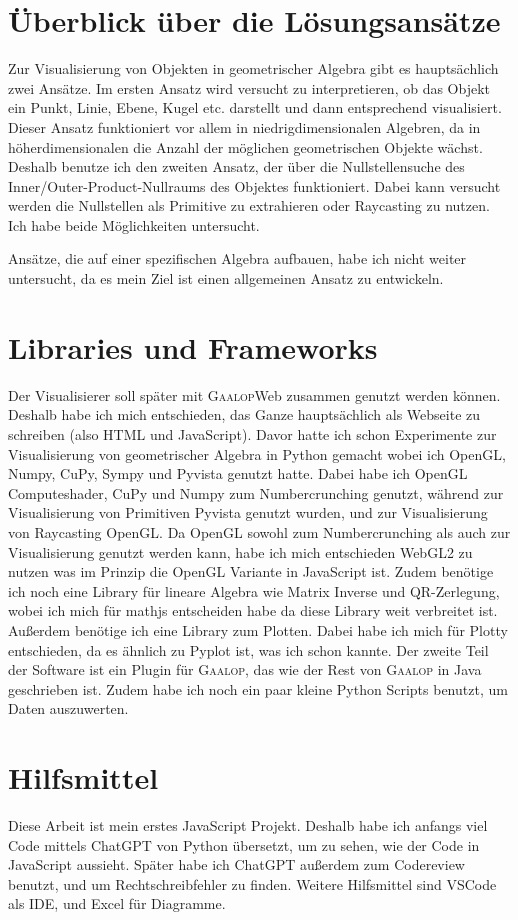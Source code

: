 \documentclass[
	ngerman,%
	accentcolor=9c,%
	ruledheaders=section,%
	class=report,%
	thesis={type=bachelor},%
	fontsize=11pt,%
	parskip=half-,%
	custommargins=true,%
	marginpar=false,%
]{tudapub}
\begin{document}
\section{Überblick über die Lösungsansätze}
Zur Visualisierung von Objekten in geometrischer Algebra gibt es hauptsächlich zwei Ansätze.
Im ersten Ansatz wird versucht zu interpretieren, ob das Objekt ein Punkt, Linie, Ebene, Kugel etc. darstellt und dann entsprechend visualisiert. Dieser Ansatz funktioniert vor allem in niedrigdimensionalen Algebren, da in höherdimensionalen die Anzahl der möglichen geometrischen Objekte wächst. Deshalb benutze ich den zweiten Ansatz, der über die Nullstellensuche des Inner/Outer-Product-Nullraums des Objektes funktioniert. Dabei kann versucht werden die Nullstellen als Primitive zu extrahieren oder Raycasting zu nutzen. Ich habe beide Möglichkeiten untersucht. 

Ansätze, die auf einer spezifischen Algebra aufbauen, habe ich nicht weiter untersucht, da es mein Ziel ist einen allgemeinen Ansatz zu entwickeln.



\section{Libraries und Frameworks}
Der Visualisierer soll später mit \textsc{Gaalop}Web zusammen genutzt werden können. Deshalb habe ich mich entschieden, das Ganze hauptsächlich als Webseite zu schreiben (also HTML und JavaScript). Davor hatte ich schon Experimente zur Visualisierung von geometrischer Algebra in Python gemacht wobei ich OpenGL, Numpy, CuPy, Sympy und Pyvista genutzt hatte. Dabei habe ich OpenGL Computeshader, CuPy und Numpy zum Numbercrunching genutzt, während zur Visualisierung von Primitiven Pyvista genutzt wurden, und zur Visualisierung von Raycasting OpenGL. 
Da OpenGL sowohl zum Numbercrunching als auch zur Visualisierung genutzt werden kann, habe ich mich entschieden WebGL2 zu nutzen was im Prinzip die OpenGL Variante in JavaScript ist. Zudem benötige ich noch eine Library für lineare Algebra wie Matrix Inverse und QR-Zerlegung, wobei ich mich für mathjs entscheiden habe da diese Library weit verbreitet ist. Außerdem benötige ich eine Library zum Plotten. Dabei habe ich mich für Plotty entschieden, da es ähnlich zu Pyplot ist, was ich schon kannte.
Der zweite Teil der Software ist ein Plugin für \textsc{Gaalop}, das wie der Rest von \textsc{Gaalop} in Java geschrieben ist.
Zudem habe ich noch ein paar kleine Python Scripts benutzt, um Daten auszuwerten.
\section{Hilfsmittel}
Diese Arbeit ist mein erstes JavaScript Projekt. Deshalb habe ich anfangs viel Code mittels ChatGPT von Python übersetzt, um zu sehen, wie der Code in JavaScript aussieht. Später habe ich ChatGPT außerdem zum Codereview benutzt, und um Rechtschreibfehler zu finden. Weitere Hilfsmittel sind VSCode als IDE, und Excel für Diagramme.
\end{document}
